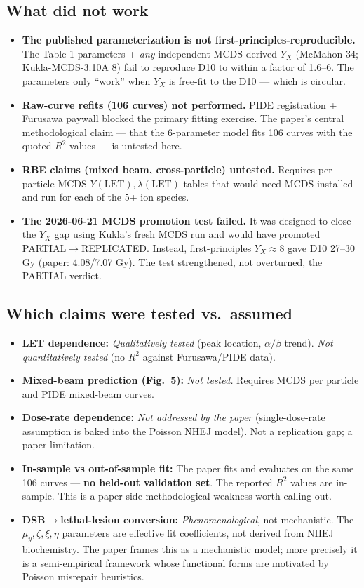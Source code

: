 \documentclass[11pt]{article}
\begin{document}
\subsection{What did not work}
\begin{itemize}[nosep,leftmargin=1.4em]
\item \textbf{The published parameterization is not first-principles-reproducible.} The Table 1 parameters + \emph{any} independent MCDS-derived $Y_X$ (McMahon 34; Kukla-MCDS-3.10A 8) fail to reproduce D10 to within a factor of 1.6--6. The parameters only ``work'' when $Y_X$ is free-fit to the D10 --- which is circular.
\item \textbf{Raw-curve refits (106 curves) not performed.} PIDE registration + Furusawa paywall blocked the primary fitting exercise. The paper's central methodological claim --- that the 6-parameter model fits 106 curves with the quoted $R^2$ values --- is untested here.
\item \textbf{RBE claims (mixed beam, cross-particle) untested.} Requires per-particle MCDS $Y(\text{LET}), \lambda(\text{LET})$ tables that would need MCDS installed and run for each of the 5+ ion species.
\item \textbf{The 2026-06-21 MCDS promotion test failed.} It was designed to close the $Y_X$ gap using Kukla's fresh MCDS run and would have promoted PARTIAL$\to$REPLICATED. Instead, first-principles $Y_X \approx 8$ gave D10 27--30 Gy (paper: 4.08/7.07 Gy). The test strengthened, not overturned, the PARTIAL verdict.
\end{itemize}

\subsection{Which claims were tested vs.\ assumed}
\begin{itemize}[nosep,leftmargin=1.4em]
\item \textbf{LET dependence:} \emph{Qualitatively tested} (peak location, $\alpha/\beta$ trend). \emph{Not quantitatively tested} (no $R^2$ against Furusawa/PIDE data).
\item \textbf{Mixed-beam prediction (Fig.\ 5):} \emph{Not tested.} Requires MCDS per particle and PIDE mixed-beam curves.
\item \textbf{Dose-rate dependence:} \emph{Not addressed by the paper} (single-dose-rate assumption is baked into the Poisson NHEJ model). Not a replication gap; a paper limitation.
\item \textbf{In-sample vs out-of-sample fit:} The paper fits and evaluates on the same 106 curves --- \textbf{no held-out validation set}. The reported $R^2$ values are in-sample. This is a paper-side methodological weakness worth calling out.
\item \textbf{DSB$\to$lethal-lesion conversion:} \emph{Phenomenological}, not mechanistic. The $\mu_y, \zeta, \xi, \eta$ parameters are effective fit coefficients, not derived from NHEJ biochemistry. The paper frames this as a mechanistic model; more precisely it is a semi-empirical framework whose functional forms are motivated by Poisson misrepair heuristics.
\end{itemize}
\end{document}
